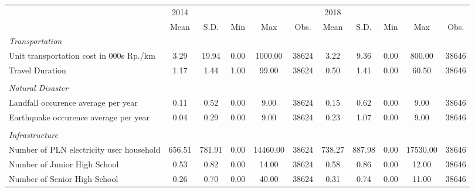 \begin{tabular}{l*{2}{ccccc}}
\toprule
                &     2014&         &         &         &         &     2018&         &         &         &         \\
                &     Mean&     S.D.&      Min&      Max&     Obs.&     Mean&     S.D.&      Min&      Max&     Obs.\\
\midrule
\emph{Transportation}&         &         &         &         &         &         &         &         &         &         \\
\hspace{0.25cm} Unit transportation cost in 000s Rp./km&     3.29&    19.94&     0.00&  1000.00&    38624&     3.22&     9.36&     0.00&   800.00&    38646\\
\hspace{0.25cm} Travel Duration&     1.17&     1.44&     1.00&    99.00&    38624&     0.50&     1.41&     0.00&    60.50&    38646\\
\vspace{0.05em} \\ \emph{Natural Disaster}&         &         &         &         &         &         &         &         &         &         \\
\hspace{0.25cm} Landfall occurence average per year&     0.11&     0.52&     0.00&     9.00&    38624&     0.15&     0.62&     0.00&     9.00&    38646\\
\hspace{0.25cm} Earthquake occurence average per year&     0.04&     0.29&     0.00&     9.00&    38624&     0.23&     1.07&     0.00&     9.00&    38646\\
\vspace{0.05em} \\ \emph{Infrastructure}&         &         &         &         &         &         &         &         &         &         \\
\hspace{0.25cm} Number of PLN electricity user household&   656.51&   781.91&     0.00& 14460.00&    38624&   738.27&   887.98&     0.00& 17530.00&    38646\\
\hspace{0.25cm} Number of Junior High School&     0.53&     0.82&     0.00&    14.00&    38624&     0.58&     0.86&     0.00&    12.00&    38646\\
\hspace{0.25cm} Number of Senior High School&     0.26&     0.70&     0.00&    40.00&    38624&     0.31&     0.74&     0.00&    11.00&    38646\\

\end{tabular}
